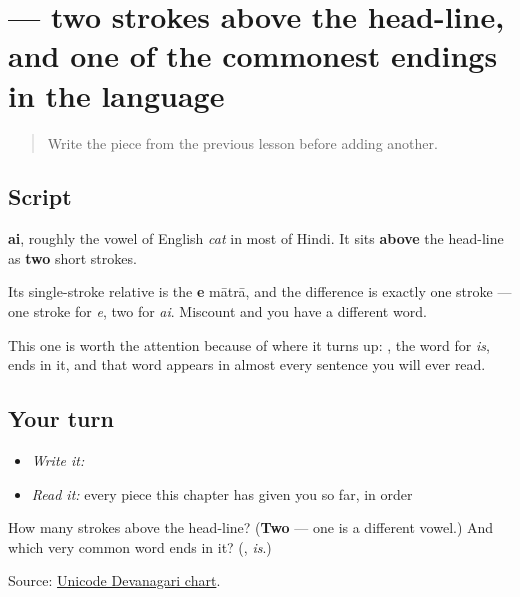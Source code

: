 \section[\texorpdfstring{\hi{ै} (-ai)}{ै (-ai)}]{ — two strokes above the head-line, and one of the commonest endings in the language}

\label{lesson:HI-W12-ai-matra}



\begin{quote}
Write the piece from the previous lesson before adding another.
\end{quote}

\subsection*{Script}
\begin{quote}
\end{quote}

\textbf{ai}, roughly the vowel of English \emph{cat} in most of Hindi. It sits \textbf{above} the head-line as \textbf{two} short strokes.

Its single-stroke relative is the \textbf{e} mātrā, and the difference is exactly one stroke — one stroke for \emph{e}, two for \emph{ai}. Miscount and you have a different word.

This one is worth the attention because of where it turns up: \textbf{}, the word for \emph{is}, ends in it, and that word appears in almost every sentence you will ever read.

\subsection*{Your turn}
\begin{itemize}
\raggedright
  \item \emph{Write it:} 
  \item \emph{Read it:} every piece this chapter has given you so far, in order
\end{itemize}

\begin{tcolorbox}[breakable,colback=teal!4,colframe=teal!35!black,title={Before you move on}]
How many strokes above the head-line? (\textbf{Two} — one is a different vowel.) And which very common word ends in it? (\textbf{}, \emph{is}.)

Source: \href{https://www.unicode.org/charts/PDF/U0900.pdf}{Unicode Devanagari chart}.
\end{tcolorbox}
